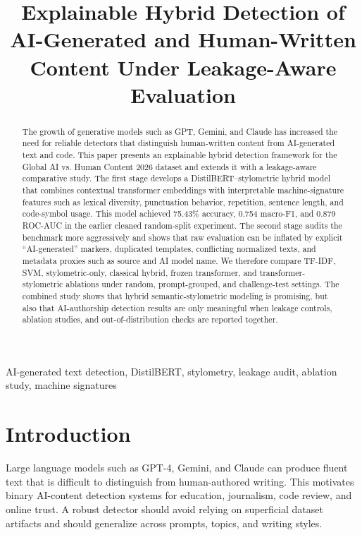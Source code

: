 \documentclass[conference]{IEEEtran}
\title{Explainable Hybrid Detection of AI-Generated and Human-Written Content Under Leakage-Aware Evaluation}
\author{
\IEEEauthorblockN{Salma Hesham Salem}
\IEEEauthorblockA{
Natural Language Processing Project\\
Global AI vs. Human Content Detection 2026\\
}
}
\begin{document}
\maketitle

\begin{abstract}
The growth of generative models such as GPT, Gemini, and Claude has increased the need for reliable detectors that distinguish human-written content from AI-generated text and code. This paper presents an explainable hybrid detection framework for the Global AI vs. Human Content 2026 dataset and extends it with a leakage-aware comparative study. The first stage develops a DistilBERT--stylometric hybrid model that combines contextual transformer embeddings with interpretable machine-signature features such as lexical diversity, punctuation behavior, repetition, sentence length, and code-symbol usage. This model achieved 75.43\% accuracy, 0.754 macro-F1, and 0.879 ROC-AUC in the earlier cleaned random-split experiment. The second stage audits the benchmark more aggressively and shows that raw evaluation can be inflated by explicit ``AI-generated'' markers, duplicated templates, conflicting normalized texts, and metadata proxies such as source and AI model name. We therefore compare TF-IDF, SVM, stylometric-only, classical hybrid, frozen transformer, and transformer-stylometric ablations under random, prompt-grouped, and challenge-test settings. The combined study shows that hybrid semantic-stylometric modeling is promising, but also that AI-authorship detection results are only meaningful when leakage controls, ablation studies, and out-of-distribution checks are reported together.
\end{abstract}

\begin{IEEEkeywords}
AI-generated text detection, DistilBERT, stylometry, leakage audit, ablation study, machine signatures
\end{IEEEkeywords}

\section{Introduction}
Large language models such as GPT-4, Gemini, and Claude can produce fluent text that is difficult to distinguish from human-authored writing. This motivates binary AI-content detection systems for education, journalism, code review, and online trust. A robust detector should avoid relying on superficial dataset artifacts and should generalize across prompts, topics, and writing styles.
\end{document}
